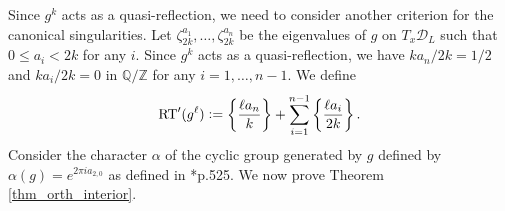 \documentclass[11pt]{amsart}
\theoremstyle{plain}
\theoremstyle{definition}
\numberwithin{equation}{section}
\newcommand{\bbQ}{\mathbb{Q}}
\newcommand{\bbZ}{\mathbb{Z}}
\newcommand{\defeq}{\vcentcolon=}
\begin{document}
Since $g^k$ acts as a quasi-reflection, we need to consider another criterion for the canonical singularities.
Let $\zeta_{2k}^{a_1},\ldots,\zeta_{2k}^{a_n}$ be the eigenvalues of $g$ on $T_x\mathcal{D}_L$ such that $0 \leq a_i < 2k$ for any $i$.
Since $g^k$ acts as a quasi-reflection, we have $ka_n/2k = 1/2$ and $ka_i/2k = 0$ in $\bbQ/\bbZ$ for any $i=1,\ldots,n-1$.
We define
\begin{equation}\label{def_sigma'}
\mathrm{RT}'(g^\ell) \defeq \left\{\frac{\ell a_n}{k}\right\} + \sum_{i=1}^{n-1} \left\{\frac{\ell a_i}{2k}\right\}. 
\end{equation}
Consider the character $\alpha$ of the cyclic group generated by $g$ defined by
$\alpha(g) = e^{2\pi i a_{2,0}}$
as defined in \cite{Gritsenko2007kodaira}*{p.525}.
We now prove Theorem \ref{thm_orth_interior}.
\end{document}
